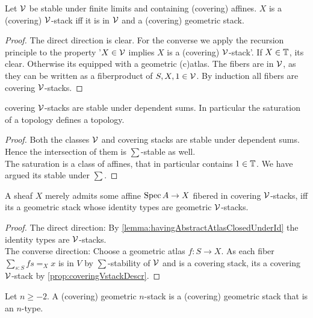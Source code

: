 \begin{prop}{\label{prop:coveringVstackDescr}}
	Let $\mathcal{V}$ be stable under finite limits and containing (covering) affines. $X$ is a (covering) $\mathcal{V}$-stack iff it is in $\mathcal{V}$ and a (covering) geometric stack.
\end{prop}
\begin{proof} 	
	The direct direction is clear. For the converse we apply the recursion principle to the property '$X \in \mathcal{V}$ implies $X$ is a (covering) $\mathcal{V}$-stack'. If $X \in \mathbb{T}$, its clear. Otherwise its equipped with a geometric (c)atlas. The fibers are in $\mathcal{V}$, as they can be written as a fiberproduct of $S, X, 1 \in \mathcal{V}$.  By induction all fibers are covering $\mathcal{V}$-stacks. %
\end{proof}
\begin{prop}{\label{prop:CSVSum}}
	covering $\mathcal{V}$-stacks are stable under dependent sums. In particular the saturation of a topology defines a topology.
\end{prop}
\begin{proof}
	Both the classes $\mathcal{V}$ and covering stacks are stable under dependent sums. Hence the intersection of them is $\sum$-stable as well. \\
	The saturation is a class of affines, that in particular contains $1 \in \mathbb{T}$. We have argued its stable under $\sum$.
\end{proof}
\begin{prop}{\label{prop:V'stacks}}
	A sheaf $X$ merely admits some affine $\operatorname{Spec} A \to X$ fibered in covering $\mathcal{V}$-stacks, iff its a geometric stack whose identity types are geometric $\mathcal{V}$-stacks. \\	
\end{prop}
\begin{proof}
	The direct direction: By \ref{lemma:havingAbstractAtlasClosedUnderId} the identity types are $\mathcal{V}$-stacks. \\
	The converse direction: Choose a geometric atlas $f : S \to X$. As each fiber $\sum_{s : S} f s =_X x$ is in $V$ by $\sum$-stability of $\mathcal{V}$ and is a covering stack, its a covering $\mathcal{V}$-stack by \ref{prop:coveringVstackDescr}.
\end{proof}
\begin{definition}
	Let $n \ge -2$. A (covering) geometric $n$-stack is a (covering) geometric stack that is an $n$-type.
\end{definition}
